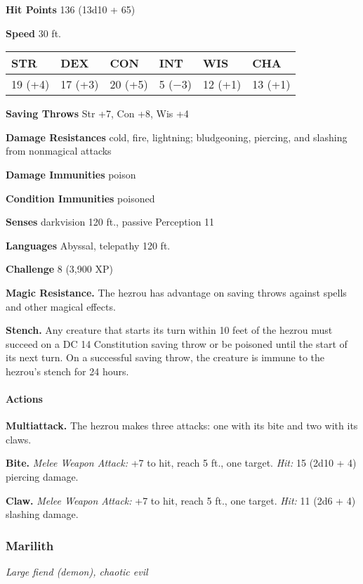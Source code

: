 \documentclass[
]{article}
\begin{document}
\textbf{Hit Points} 136 (13d10 + 65)

\textbf{Speed} 30 ft.

\begin{longtable}[]{@{}llllll@{}}
\toprule
STR & DEX & CON & INT & WIS & CHA\tabularnewline
\midrule
\endhead
19 (+4) & 17 (+3) & 20 (+5) & 5 (−3) & 12 (+1) & 13 (+1)\tabularnewline
\bottomrule
\end{longtable}

\textbf{Saving Throws} Str +7, Con +8, Wis +4

\textbf{Damage Resistances} cold, fire, lightning; bludgeoning,
piercing, and slashing from nonmagical attacks

\textbf{Damage Immunities} poison

\textbf{Condition Immunities} poisoned

\textbf{Senses} darkvision 120 ft., passive Perception 11

\textbf{Languages} Abyssal, telepathy 120 ft.

\textbf{Challenge} 8 (3,900 XP)

\textbf{Magic Resistance.} The hezrou has advantage on saving throws
against spells and other magical effects.

\textbf{Stench.} Any creature that starts its turn within 10 feet of the
hezrou must succeed on a DC 14 Constitution saving throw or be poisoned
until the start of its next turn. On a successful saving throw, the
creature is immune to the hezrou's stench for 24 hours.

\hypertarget{actions-4}{%
\paragraph{Actions}\label{actions-4}}

\textbf{Multiattack.} The hezrou makes three attacks: one with its bite
and two with its claws.

\textbf{Bite.} \emph{Melee Weapon Attack:} +7 to hit, reach 5 ft., one
target. \emph{Hit:} 15 (2d10 + 4) piercing damage.

\textbf{Claw.} \emph{Melee Weapon Attack:} +7 to hit, reach 5 ft., one
target. \emph{Hit:} 11 (2d6 + 4) slashing damage.

\hypertarget{marilith}{%
\subsubsection{Marilith}\label{marilith}}

\emph{Large fiend (demon), chaotic evil}
\end{document}
